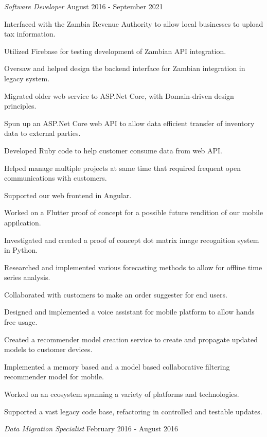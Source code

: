 \documentclass{marvinkassabian_resume}
\begin{document}
						{\textit{Software Developer}}
						{August 2016 - September 2021}
					\resumesublistbegin
						\item Interfaced with the Zambia Revenue Authority to allow local businesses to upload tax information.
						\item Utilized Firebase for testing development of Zambian API integration.
						\item Oversaw and helped design the backend interface for Zambian integration in legacy system.
						\item Migrated older web service to ASP.Net Core, with Domain-driven design principles.
						\item Spun up an ASP.Net Core web API to allow data efficient transfer of inventory data to external parties.
						\item Developed Ruby code to help customer consume data from web API.
						\item Helped manage multiple projects at same time that required frequent open communications with customers.
						\item Supported our web frontend in Angular.
						\item Worked on a Flutter proof of concept for a possible future rendition of our mobile appilcation.
						\item Investigated and created a proof of concept dot matrix image recognition system in Python.
						\item Researched and implemented various forecasting methods to allow for offline time series analysis.
						\item Collaborated with customers to make an order suggester for end users.
						\item Designed and implemented a voice assistant for mobile platform to allow hands free usage. 
						\item Created a recommender model creation service to create and propagate updated models to customer devices.
						\item Implemented a memory based and a model based collaborative filtering recommender model for mobile.
						\item Worked on an ecosystem spanning a variety of platforms and technologies.
						\item Supported a vast legacy code base, refactoring in controlled and testable updates.
					\resumesublistend
				\item[] \subsectiondate
						{\textit{Data Migration Specialist}}
						{February 2016 - August 2016}
\end{document}
